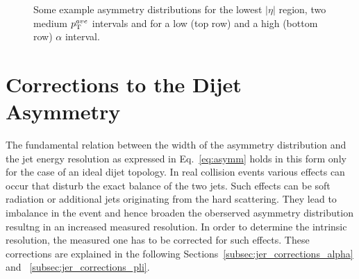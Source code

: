 \begin{figure}[!tp]
\begin{tabular}{cc}
  \end{tabular}
  \caption{Some example asymmetry distributions for the lowest $|\eta|$ region, two medium $p_{\text{T}}^{ave}$ intervals and for a low (top row) and a high (bottom row) $\alpha$ interval.}
  \label{fig:asymm_dists}
\end{figure}

\section{Corrections to the Dijet Asymmetry}
\label{sec:jer_corrections}
The fundamental relation between the width of the asymmetry distribution and the jet energy resolution as expressed in Eq.~\ref{eq:asymm} holds in this form only for the case of an ideal dijet topology. In real collision events various effects can occur that disturb the exact balance of the two jets. Such effects can be soft radiation or additional jets originating from the hard scattering. They lead to imbalance in the event and hence broaden the oberserved asymmetry distribution resultng in an increased measured resolution. In order to determine the intrinsic resolution, the measured one has to be corrected for such effects. These corrections are explained in the following Sections~\ref{subsec:jer_corrections_alpha} and ~\ref{subsec:jer_corrections_pli}.


